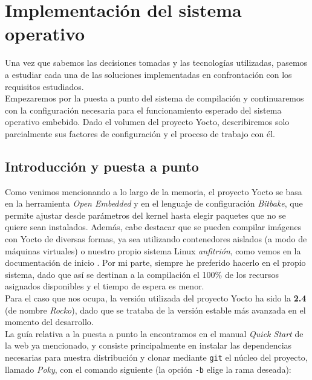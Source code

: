 \chapter{Implementación del sistema operativo}

Una vez que sabemos las decisiones tomadas y las tecnologías utilizadas, pasemos a estudiar cada una de las soluciones implementadas en confrontación con los requisitos estudiados.\\

Empezaremos por la puesta a punto del sistema de compilación y continuaremos con la configuración necesaria para el funcionamiento esperado del sistema operativo embebido. Dado el volumen del proyecto Yocto, describiremos solo parcialmente sus factores de configuración y el proceso de trabajo con él.

\section{Introducción y puesta a punto}

Como venimos mencionando a lo largo de la memoria, el proyecto Yocto se basa en la herramienta \textit{Open Embedded} y en el lenguaje de configuración \textit{Bitbake}, que permite ajustar desde parámetros del kernel hasta elegir paquetes que no se quiere sean instalados. Además, cabe destacar que se pueden compilar imágenes con Yocto de diversas formas, ya sea utilizando contenedores aislados (a modo de máquinas virtuales) o nuestro propio sistema Linux \textit{anfitrión}, como vemos en la documentación de inicio \cite{yocto-project-quick-start-build-system}. Por mi parte, siempre he preferido hacerlo en el propio sistema, dado que así se destinan a la compilación el 100\% de los recursos asignados disponibles y el tiempo de espera es menor.\\

Para el caso que nos ocupa, la versión utilizada del proyecto Yocto ha sido la \textbf{2.4} (de nombre \textit{Rocko}), dado que se trataba de la versión estable más avanzada en el momento del desarrollo.\\

La guía relativa a la puesta a punto la encontramos en el manual \textit{Quick Start} de la web \cite{yocto-project-quick-start} ya mencionado, y consiste principalmente en instalar las dependencias necesarias para nuestra distribución y clonar mediante \texttt{git} el núcleo del proyecto, llamado \textit{Poky}, con el comando siguiente (la opción \texttt{-b} elige la rama deseada):

